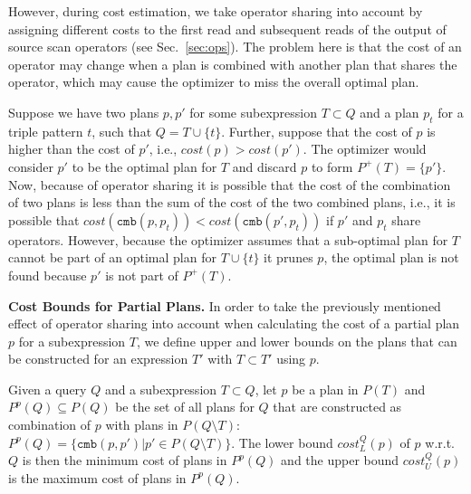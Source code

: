 However, during cost estimation, we take operator sharing into account
by assigning different costs to the first read and subsequent reads of
the output of source scan operators (see Sec.~\ref{sec:ops}). The
problem here is that the cost of an operator may change when a plan is
combined with another plan that shares the operator, which may cause
the optimizer to miss the overall optimal plan.

Suppose we have two plans $p,p'$ for some subexpression $T \subset Q$
and a plan $p_t$ for a triple pattern $t$, such that $Q = T \cup
\{t\}$. Further, suppose that the cost of $p$ is higher than the cost
of $p'$, i.e., $cost(p) > cost(p')$. The optimizer would consider $p'$
to be the optimal plan for $T$ and discard $p$ to form
$P^+(T)=\{p'\}$. Now, because of operator sharing it is possible that
the cost of the combination of two plans is less than the sum of the
cost of the two combined plans, i.e., it is possible that
$cost(\mathtt{cmb}(p,p_t)) < cost(\mathtt{cmb}(p',p_t))$ if $p'$ and
$p_t$ share operators. However, because the optimizer assumes that a
sub-optimal plan for $T$ cannot be part of an optimal plan for $T \cup
\{t\}$ it prunes $p$, the optimal plan is not found because $p'$ is
not part of $P^+(T)$.


\textbf{Cost Bounds for Partial Plans.} In order to take the
previously mentioned effect of operator sharing into account when
calculating the cost of a partial plan $p$ for a subexpression $T$, we
define upper and lower bounds on the plans that can be constructed for
an expression $T'$ with $T \subset T'$ using $p$.

\begin{definition}
  \label{def:bounds}
  Given a query $Q$ and a subexpression $T \subset Q$, let $p$ be a
  plan in $P(T)$ and $P^p(Q) \subseteq P(Q)$ be the set of all plans
  for $Q$ that are constructed as combination of $p$ with plans in
  $P(Q \setminus T)$: $P^p(Q) = \{\mathtt{cmb}(p,p') | p' \in P(Q
  \setminus T)\}$.  The lower bound $cost_L^Q(p)$ of $p$ w.r.t. $Q$
  is then the minimum cost of plans in $P^p(Q)$ and the upper bound
  $cost_U^Q(p)$ is the maximum cost of plans in $P^p(Q)$.
\end{definition}

